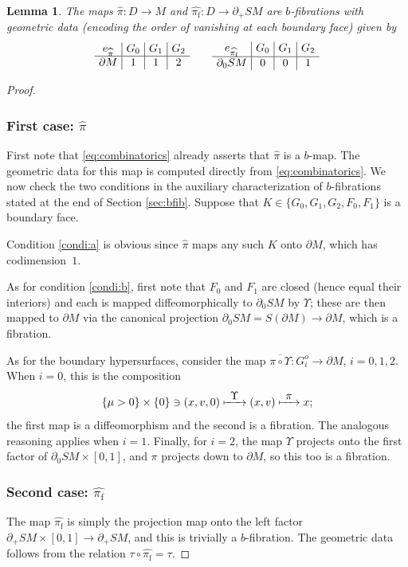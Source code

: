 \documentclass[JEP,XML,SOM,Unicode,NoFloatCountersInSection, NoEqCountersInSection,published]{cedram}
\def\To#1{\mathchoice{\xrightarrow{\textstyle\kern4pt#1\kern3pt}}{\stackrel{#1}{\longrightarrow}}{}{}}
\def\Mto#1{\mathrel{\mapstochar\To{#1}}}
\theoremstyle{plain}
\newtheorem{Lemma}[Theorem]{Lemma}
\theoremstyle{definition}
\theoremstyle{remark}
\newcommand{\hpi}{\widehat{\pi}}
\newcommand{\del}{\partial}
\newcommand{\foot}{{\pi_{\mathrm f}}}
\newcommand{\hF}{\widehat{\foot}}
\begin{document}
\begin{Lemma}\label{lem:bfibrations}
The maps $\hpi\colon D\to M$ and $\hF\colon D\to \partial_+ SM$ are $b$-fibrations with geometric data (encoding
the order of vanishing at each boundary face) given by\vspace*{-3pt}
\begin{equation*}\arraycolsep4pt
\begin{array}{c|c|c|c}
e_{\hpi} & G_0 & G_1 & G_2 \\
\hline
\partial M & 1 & 1 & 2
\end{array}
\qquad
\begin{array}{c|c|c|c}
e_{\hF} & G_0 & G_1 & G_2 \\
\hline
\partial_0 SM & 0 & 0 & 1
\end{array}
\end{equation*}
\end{Lemma}

\skpt
\begin{proof}\vspace*{-3pt}
\subsubsection*{First case: $\hpi$}
First note that \eqref{eq:combinatorics} already asserts that $\hpi$ is a $b$-map.
The geometric data for this map is computed directly from \eqref{eq:combinatorics}. We now check the two
conditions in the auxiliary characterization of $b$-fibrations stated at the end of Section \ref{sec:bfib}. Suppose that $K \in \{G_0, G_1, G_2, F_0, F_1\}$ is a boundary face.

Condition \eqref{condi:a} is obvious since $\hpi$ maps any such $K$ onto $\del M$, which has codimension~$1$.

As for condition \eqref{condi:b}, first note that $F_0$ and $F_1$ are closed (hence equal their interiors) and each is mapped
diffeomorphically to $\partial_0 SM$ by $\Upsilon$; these are then mapped to $\partial M$ via the canonical projection
$\partial_{0} SM = S (\partial M) \to \partial M$, which is a fibration.

As for the boundary hypersurfaces, consider the map $\overline{\pi\circ\Upsilon} \colon G_i^o \to \partial M$, $i=0,1,2$.
When $i = 0$, this is the composition
\begin{equation*}
\{ \mu>0\}\times \{0\}\ni (x,v,0) \Mto{\Upsilon} (x,v) \Mto{\pi} x;
\end{equation*}
the first map is a diffeomorphism and the second is a fibration. The analogous reasoning applies when $i = 1$. Finally, for $i=2$,
the map $\Upsilon$ projects onto the first factor of $\del_0 SM \times [0,1]$, and $\pi$ projects down to $\partial M$, so this
too is a fibration.

\subsubsection*{Second case: $\hF$}
The map $\hF$ is simply the projection map onto the left factor $\partial_+{SM}\times [0,1]\to \partial_+ SM$, and this
is trivially a $b$-fibration. The geometric data follows from the relation $\tau\circ\hF = \tau$.
\end{proof}
\end{document}
